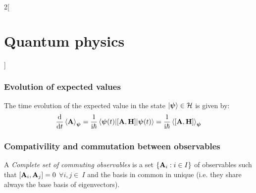 \documentclass[../../../main_physics.tex]{subfiles}
\begin{document}
\begin{multicols}{2}[\section{Quantum physics}]
  \subsubsection{Evolution of expected values}
  \begin{proposition}
    The time evolution of the expected value in the state $\ket{\boldsymbol{\mathrm{\psi}}}\in\mathcal{H}$ is given by:
    $$\dv{}{t}\ev{\vf{A}}_{\vf\psi}=\frac{1}{\ii\hbar}\ev{\comm{\vf{A}}{\vf{H}}}{\vf\psi(t)}=\frac{1}{\ii\hbar}\ev{\comm{\vf{A}}{\vf{H}}}_{\vf\psi}$$
  \end{proposition}
  \subsubsection{Compativility and commutation between observables}
  \begin{definition}
    A \emph{Complete set of commuting observables} is a set $\{\boldsymbol{\mathrm{A}}_i:i\in I\}$ of observables such that $\comm{\vf{A}_i}{\vf{A}_j}=0$ $\forall i,j\in\ I$ and the basis in common in unique (i.e. they share always the base basis of eigenvectors).
  \end{definition}

\end{multicols}
\end{document}
